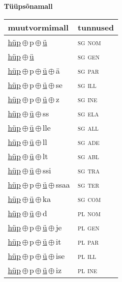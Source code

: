 

\vspace{3.5em}
\noindent \begin{minipage}{\textwidth}
\noindent \textbf{Tüüpsõnamall \,}\\

\begin{sideways}
\begin{tabular}{l l}
muutvormimall & tunnused \\
\hline
\underline{hüp}\,$\oplus$\,p\,$\oplus$\,\underline{ü} & \textsc{ sg nom } \\
\underline{hüp}\,$\oplus$\,\underline{ü} & \textsc{ sg gen } \\
\underline{hüp}\,$\oplus$\,p\,$\oplus$\,\underline{ü}\,$\oplus$\,ä & \textsc{ sg par } \\
\underline{hüp}\,$\oplus$\,p\,$\oplus$\,\underline{ü}\,$\oplus$\,se & \textsc{ sg ill } \\
\underline{hüp}\,$\oplus$\,p\,$\oplus$\,\underline{ü}\,$\oplus$\,z & \textsc{ sg ine } \\
\underline{hüp}\,$\oplus$\,\underline{ü}\,$\oplus$\,ss & \textsc{ sg ela } \\
\underline{hüp}\,$\oplus$\,\underline{ü}\,$\oplus$\,lle & \textsc{ sg all } \\
\underline{hüp}\,$\oplus$\,\underline{ü}\,$\oplus$\,ll & \textsc{ sg ade } \\
\underline{hüp}\,$\oplus$\,\underline{ü}\,$\oplus$\,lt & \textsc{ sg abl } \\
\underline{hüp}\,$\oplus$\,\underline{ü}\,$\oplus$\,ssi & \textsc{ sg tra } \\
\underline{hüp}\,$\oplus$\,p\,$\oplus$\,\underline{ü}\,$\oplus$\,ssaa & \textsc{ sg ter } \\
\underline{hüp}\,$\oplus$\,\underline{ü}\,$\oplus$\,ka & \textsc{ sg com } \\
\underline{hüp}\,$\oplus$\,\underline{ü}\,$\oplus$\,d & \textsc{ pl nom } \\
\underline{hüp}\,$\oplus$\,p\,$\oplus$\,\underline{ü}\,$\oplus$\,je & \textsc{ pl gen } \\
\underline{hüp}\,$\oplus$\,p\,$\oplus$\,\underline{ü}\,$\oplus$\,it & \textsc{ pl par } \\
\underline{hüp}\,$\oplus$\,p\,$\oplus$\,\underline{ü}\,$\oplus$\,ise & \textsc{ pl ill } \\
\underline{hüp}\,$\oplus$\,p\,$\oplus$\,\underline{ü}\,$\oplus$\,iz & \textsc{ pl ine } \\

\end{tabular}
\end{sideways}
\end{minipage}
